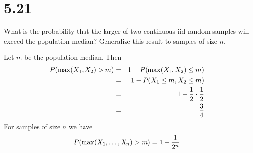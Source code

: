 \section*{5.21}
What is the probability that the larger of two continuous iid random
samples will exceed the population median? Generalize this result
to samples of size $n$.

\bigskip
\noindent
Let $m$ be the population median.
Then
\begin{eqnarray*}
P(\max(X_1,X_2)>m)&=&1-P(\max(X_1,X_2)\le m)\\
&=&1-P(X_1\le m, X_2\le m)\\
&=&1-{1\over2}\cdot{1\over2}\\
&=&{3\over4}
\end{eqnarray*}
For samples of size $n$ we have
$$P(\max(X_1,\ldots,X_n)>m)=1-{1\over2^n}$$

